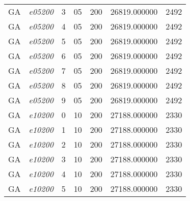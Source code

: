 {\begin{longtable}{cc|c|cc|cc}
			GA                 & \textit{e05200}    & 3                               & 05               & 200              & 26819.000000                          & 2492 \\ 
			GA                 & \textit{e05200}    & 4                               & 05               & 200              & 26819.000000                          & 2492 \\ 
			GA                 & \textit{e05200}    & 5                               & 05               & 200              & 26819.000000                          & 2492 \\ 
			GA                 & \textit{e05200}    & 6                               & 05               & 200              & 26819.000000                          & 2492 \\ 
			GA                 & \textit{e05200}    & 7                               & 05               & 200              & 26819.000000                          & 2492 \\ 
			GA                 & \textit{e05200}    & 8                               & 05               & 200              & 26819.000000                          & 2492 \\ 
			GA                 & \textit{e05200}    & 9                               & 05               & 200              & 26819.000000                          & 2492 \\ \hline
			GA                 & \textit{e10200}    & 0                               & 10               & 200              & 27188.000000                          & 2330 \\ 
			GA                 & \textit{e10200}    & 1                               & 10               & 200              & 27188.000000                          & 2330 \\ 
			GA                 & \textit{e10200}    & 2                               & 10               & 200              & 27188.000000                          & 2330 \\ 
			GA                 & \textit{e10200}    & 3                               & 10               & 200              & 27188.000000                          & 2330 \\ 
			GA                 & \textit{e10200}    & 4                               & 10               & 200              & 27188.000000                          & 2330 \\ 
			GA                 & \textit{e10200}    & 5                               & 10               & 200              & 27188.000000                          & 2330 \\ 

\end{longtable}}
